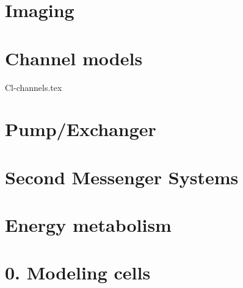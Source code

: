 \documentclass[11pt]{book}
\begin{document}
\part{Imaging}




\part{Channel models}


{Cl-channels.tex}






%








 


\part{Pump/Exchanger}








\part{Second Messenger Systems}






\part{Energy metabolism}


\part{0. Modeling cells}




\end{document}
